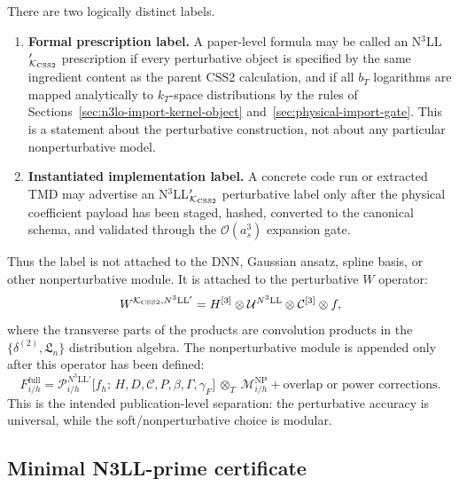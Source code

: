 \documentclass[11pt]{article}
\newcommand{\deltaT}{\delta^{(2)}}
\newcommand{\ot}{\otimes_T}
\newcommand{\order}[1]{\mathcal{O}\!\left(#1\right)}
\newcommand{\NP}{\mathrm{NP}}
\newcommand{\KCSS}{\mathcal K_{\rm CSS2}}
\begin{document}
There are two logically distinct labels.
\begin{enumerate}
  \item \textbf{Formal prescription label.}  A paper-level formula may be called an
  N$^3$LL$'_{\KCSS}$ prescription if every perturbative object is specified by the same
  ingredient content as the parent CSS2 calculation, and if all $b_T$ logarithms are mapped
  analytically to $k_T$-space distributions by the rules of Sections~\ref{sec:n3lo-import-kernel-object}
  and~\ref{sec:physical-import-gate}.  This is a statement about the perturbative
  construction, not about any particular nonperturbative model.

  \item \textbf{Instantiated implementation label.}  A concrete code run or extracted TMD
  may advertise an N$^3$LL$'_{\KCSS}$ perturbative label only after the physical coefficient
  payload has been staged, hashed, converted to the canonical schema, and validated through
  the $\order{a_s^3}$ expansion gate.
\end{enumerate}

Thus the label is not attached to the DNN, Gaussian ansatz, spline basis, or other
nonperturbative module.  It is attached to the perturbative $W$ operator:
\begin{equation}
  W^{\KCSS,N^3\mathrm{LL}'}
  =
  H^{[3]}
  \otimes
  \mathcal U^{N^3\mathrm{LL}}
  \otimes
  \mathcal C^{[3]}
  \otimes
  f,
  \label{eq:n3llprime-certificate-core-v16}
\end{equation}
where the transverse parts of the products are convolution products in the
$\{\deltaT,\mathfrak L_n\}$ distribution algebra.  The nonperturbative module is appended
only after this operator has been defined:
\begin{equation}
  F_{i/h}^{\mathrm{full}}
  =
  \mathcal P_{i/h}^{N^3\mathrm{LL}'}
  \bigl[f_h;\,H,D,\mathcal C,P,\beta,\Gamma,\gamma_F\bigr]
  \ \ot\
  \mathcal M_{i/h}^{\NP}
  + \text{overlap or power corrections} .
  \label{eq:n3llprime-np-separated-v16}
\end{equation}
This is the intended publication-level separation: the perturbative accuracy is universal,
while the soft/nonperturbative choice is modular.

\subsection{Minimal N3LL-prime certificate}
\end{document}
